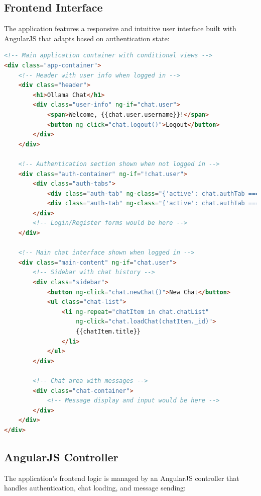\documentclass[12pt,a4paper]{article}
\begin{document}
\subsection{Frontend Interface}
The application features a responsive and intuitive user interface built with AngularJS that adapts based on authentication state:

\begin{lstlisting}[language=HTML]
<!-- Main application container with conditional views -->
<div class="app-container">
    <!-- Header with user info when logged in -->
    <div class="header">
        <h1>Ollama Chat</h1>
        <div class="user-info" ng-if="chat.user">
            <span>Welcome, {{chat.user.username}}!</span>
            <button ng-click="chat.logout()">Logout</button>
        </div>
    </div>

    <!-- Authentication section shown when not logged in -->
    <div class="auth-container" ng-if="!chat.user">
        <div class="auth-tabs">
            <div class="auth-tab" ng-class="{'active': chat.authTab === 'login'}">Login</div>
            <div class="auth-tab" ng-class="{'active': chat.authTab === 'register'}">Register</div>
        </div>
        <!-- Login/Register forms would be here -->
    </div>

    <!-- Main chat interface shown when logged in -->
    <div class="main-content" ng-if="chat.user">
        <!-- Sidebar with chat history -->
        <div class="sidebar">
            <button ng-click="chat.newChat()">New Chat</button>
            <ul class="chat-list">
                <li ng-repeat="chatItem in chat.chatList"
                    ng-click="chat.loadChat(chatItem._id)">
                    {{chatItem.title}}
                </li>
            </ul>
        </div>

        <!-- Chat area with messages -->
        <div class="chat-container">
            <!-- Message display and input would be here -->
        </div>
    </div>
</div>
\end{lstlisting}

\subsection{AngularJS Controller}
The application's frontend logic is managed by an AngularJS controller that handles authentication, chat loading, and message sending:
\end{document}

